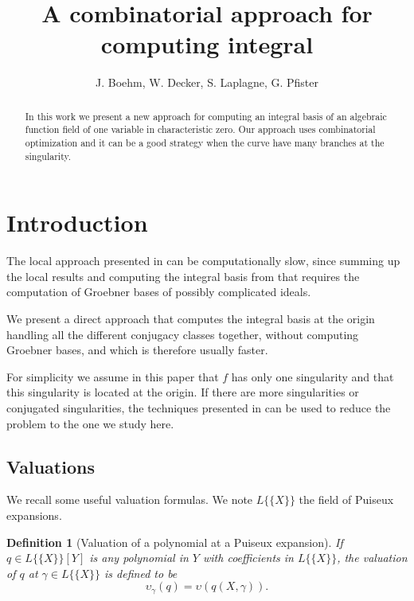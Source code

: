 \documentclass[a4paper,11pt]{amsart}%
\theoremstyle{definition}
\theoremstyle{plain}
\newtheorem{defn}{Definition}[section]
\theoremstyle{remark}
\begin{document}
\title[Combinatorial approach for integral bases]{A combinatorial approach for computing integral}
\author{J. Boehm, W. Decker, S. Laplagne, G. Pfister}

\begin{abstract}
In this work we present a new approach for computing an integral basis of an algebraic function field of one variable in characteristic zero. Our approach uses combinatorial optimization and it can be a good strategy when the curve have many branches at the singularity.
\end{abstract}
\maketitle

\section{Introduction}
\label{section:introduction}

The local approach presented in \cite{intbas} can be computationally
slow, since summing up the local results and computing the integral basis from
that requires the computation of Groebner bases of possibly complicated ideals.

We present a direct approach that computes the integral basis at the origin
handling all the different conjugacy classes together, without computing
Groebner bases, and which is therefore usually faster.

For simplicity we assume in this paper that $f$ has only one singularity and that this singularity is located at the origin.
If there are more singularities or conjugated singularities, the techniques presented in \cite{intbas} can be used to reduce the problem to the one we study here.

\subsection{Valuations}

We recall some useful valuation formulas. We note $L\{\{X\}\}$ the field of Puiseux expansions.

\begin{defn}[Valuation of a polynomial at a Puiseux expansion]
If $q\in L\{\{X\}\}[Y]$ is any polynomial in $Y$ with coefficients in
$L\{\{X\}\}$, the {\emph{valuation}} of $q$ at $\gamma\in L\{\{X\}\}$ is
defined to be
$$\upsilon_{\gamma}(q)=\upsilon(q(X,\gamma)).$$
\end{defn}
\end{document}
